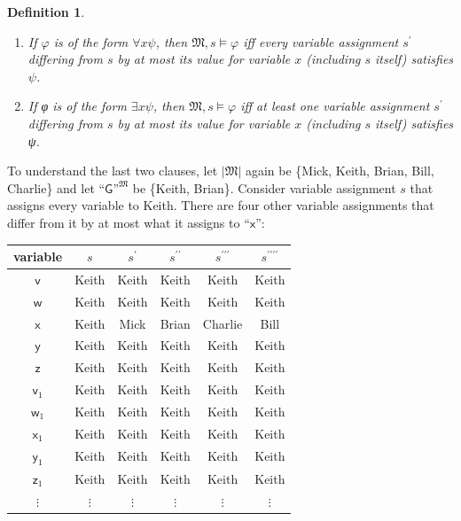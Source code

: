 \documentclass[12pt]{report}
\theoremstyle{nonumberplain}
\newtheorem{definition}{Definition}
\newcommand{\M}{\mathfrak{M}}
\renewcommand{\o}[1]{\mathsf{#1}}
\begin{document}
\begin{definition}
\begin{enumerate}[label=\textup{(\roman*)},itemsep=0.5\baselineskip]
\textup{I.e., an assignment satisfies a biconditional iff it satisfies either both or neither side.}

\item If $φ$ is of the form $∀xψ$, then $\M, s ⊨ φ$ iff every variable assignment $s^\prime$ differing from $s$ by at most its value for variable $x$ (including $s$ itself) satisfies $ψ$.

\item If φ is of the form $∃xψ$, then $\M, s ⊨ φ$ iff at least one variable assignment $s^\prime$ differing from $s$ by at most its value for variable $x$ (including $s$ itself) satisfies ψ.

\end{enumerate}
\end{definition}

\noindent To understand the last two clauses, let $|\M|$ again be \{Mick, Keith, Brian, Bill, Charlie\} and let $\text{``}\o{G}\text{''}^{\M}$ be \{Keith, Brian\}. Consider variable assignment $s$ that assigns every variable to Keith. There are four other variable assignments that differ from it by at most what it assigns to ``$\o{x}$'':

\medskip\noindent\begin{tabular}{@{}cccccc@{}}
variable & $s$   & $s^{\prime}$ & $s^{\prime\prime}$ & $s^{\prime\prime\prime}$ & $s^{\prime\prime\prime\prime}$ \\ \hline
$\o{v}$        & Keith & Keith & Keith & Keith & Keith \\
$\o{w}$        & Keith & Keith & Keith & Keith & Keith \\
$\o{x}$        & Keith & Mick & Brian & Charlie & Bill \\
$\o{y}$        & Keith & Keith & Keith & Keith & Keith \\
$\o{z}$        & Keith & Keith & Keith & Keith & Keith \\
$\o{v}_1$    & Keith & Keith & Keith & Keith & Keith \\
$\o{w}_1$    & Keith & Keith & Keith & Keith & Keith \\
$\o{x}_1$    & Keith & Keith & Keith & Keith & Keith \\
$\o{y}_1$    & Keith & Keith & Keith & Keith & Keith \\
$\o{z}_1$    & Keith & Keith & Keith & Keith & Keith \\
$\vdots$ &$\vdots$ &$\vdots$ &$\vdots$ &$\vdots$ & $\vdots$ \\ \hline
\end{tabular}
\end{document}
